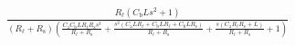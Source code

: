 $\frac{R_{\ell} \left(C_{\mathrm{b}} L s^{2} + 1\right)}{\left(R_{\ell} + R_{\mathrm{s}}\right) \left(\frac{C_{\mathrm{a}} C_{\mathrm{b}} L R_{\ell} R_{\mathrm{s}} s^{3}}{R_{\ell} + R_{\mathrm{s}}} + \frac{s^{2} \left(C_{\mathrm{a}} L R_{\ell} + C_{\mathrm{b}} L R_{\ell} + C_{\mathrm{b}} L R_{\mathrm{s}}\right)}{R_{\ell} + R_{\mathrm{s}}} + \frac{s \left(C_{\mathrm{a}} R_{\ell} R_{\mathrm{s}} + L\right)}{R_{\ell} + R_{\mathrm{s}}} + 1\right)}$ 